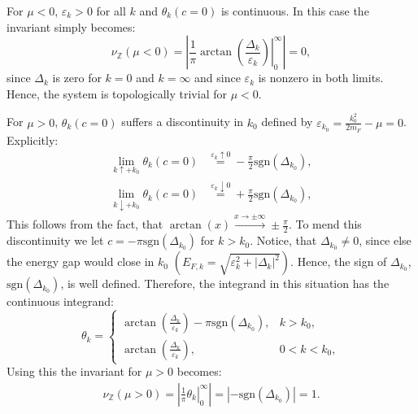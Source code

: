 For $\mu < 0$, $\varepsilon_k > 0$ for all $k$ and $\theta_k(c = 0)$ is continuous. In this case the invariant simply becomes:
\begin{equation}
\nu_{\mathbb{Z}}(\mu < 0) = \left|\left. \frac{1}{\pi}\arctan\left(\frac{\Delta_k}{\varepsilon_k}\right)\right|_{0}^{\infty}\right| = 0,
\end{equation}
since $\Delta_k$ is zero for $k = 0$ and $k = \infty$ and since $\varepsilon_k$ is nonzero in both limits. Hence, the system is topologically trivial for $\mu < 0$. 

For $\mu > 0$, $\theta_k(c = 0)$ suffers a discontinuity in $k_0$ defined by $\varepsilon_{k_0} = \frac{k_0^2}{2m_F} - \mu = 0$. Explicitly:  
\begin{align}
\lim_{k \uparrow +k_0} \theta_k(c = 0) &\overset{\varepsilon_k \uparrow 0}{=} 	  - \frac{\pi}{2}\text{sgn}(\Delta_{k_0}), \nonumber \\
\lim_{k \downarrow +k_0} \theta_k(c = 0) &\overset{\varepsilon_k \downarrow 0}{=} + \frac{\pi}{2}\text{sgn}(\Delta_{k_0}), \nonumber
\end{align}
This follows from the fact, that $\arctan(x) \overset{x \to \pm \infty}{\to} \pm \frac{\pi}{2}$. To mend this discontinuity we let $ c = -\pi\text{sgn}(\Delta_{k_0})$ for $k > k_0$. Notice, that $\Delta_{k_0} \neq 0$, since else the energy gap would close in $k_0$ $\left(E_{F,k} = \sqrt{\varepsilon^2_k + |\Delta_k|^2}\right)$. Hence, the sign of $\Delta_{k_0}$, $\text{sgn}(\Delta_{k_0})$, is well defined. Therefore, the integrand in this situation has the continuous integrand:
\begin{equation}
\theta_k = \left\{ \begin{matrix} 
\arctan\left(\frac{\Delta_k}{\varepsilon_k}\right) - \pi\text{sgn}(\Delta_{k_0}), & k > k_0, \\
\arctan\left(\frac{\Delta_k}{\varepsilon_k}\right), & 0 < k < k_0,
  \end{matrix} \right.
\label{eq.thetakmugreater0}
\end{equation}
Using this the invariant for $\mu > 0$ becomes:
\begin{align}
\nu_{\mathbb{Z}}(\mu > 0) = \left|\left. \frac{1}{\pi} \theta_k\right|_0^{\infty}\right| = \left|-\text{sgn}(\Delta_{k_0})\right| = 1.
\label{eq.CSinv2}
\end{align}
